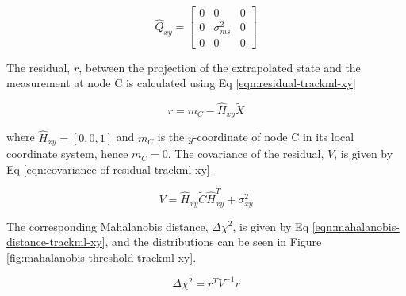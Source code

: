 \begin{equation}
\hat{Q}_{xy} = \begin{bmatrix} 
                0 & 0 & 0 \\ 
                0 & \sigma_{ms}^2 & 0 \\
                0 & 0 & 0 \end{bmatrix} 
\label{eqn:process-noise-Q-extrapolation-xy}
\end{equation}

The residual, $r$, between the projection of the extrapolated state and the measurement at node C is calculated using Eq \eqref{eqn:residual-trackml-xy}

\begin{equation}
r = m_C - \hat{H}_{xy} \tilde{X}
\label{eqn:residual-trackml-xy}
\end{equation}

where $\hat{H}_{xy} = [0, 0, 1]$ and $m_C$ is the $y$-coordinate of node C in its local coordinate system, hence $m_C = 0$. The covariance of the residual, $V$, is given by Eq \eqref{eqn:covariance-of-residual-trackml-xy}

\begin{equation}
{V} = \hat{H}_{xy} \widetilde{C} \hat{H}^{T}_{xy} + \sigma_{xy}^{2}
\label{eqn:covariance-of-residual-trackml-xy}
\end{equation}

The corresponding Mahalanobis distance, $\Delta \chi^{2}$, is given by Eq \eqref{eqn:mahalanobis-distance-trackml-xy}, and the distributions can be seen in Figure \ref{fig:mahalanobis-threshold-trackml-xy}.

\begin{equation}
\Delta \chi^{2} = r^{T} {V}^{-1} r
\label{eqn:mahalanobis-distance-trackml-xy}
\end{equation}




